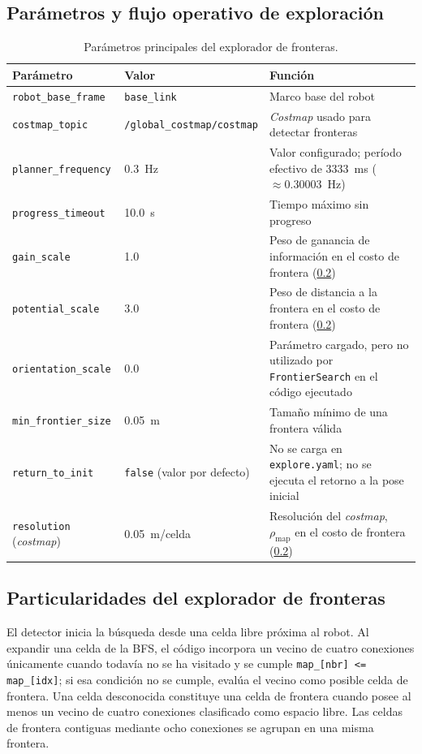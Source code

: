 \begin{appendices}
\subsection{Parámetros y flujo operativo de exploración}

\begin{table}[H]
\centering
\caption{Parámetros principales del explorador de fronteras.}
\label{tab:explore_params_ch9}
\small
\begin{tabular}{p{3.5cm} p{4.5cm} p{5.8cm}}
\toprule
\textbf{Parámetro} & \textbf{Valor} & \textbf{Función} \\
\midrule
\texttt{robot\_base\_frame} & \texttt{base\_link} & Marco base del robot \\
\texttt{costmap\_topic} & \texttt{/global\_costmap/costmap} & \textit{Costmap} usado para detectar fronteras \\
\texttt{planner\_frequency} & 0.3~Hz & Valor configurado; período efectivo de 3333~ms ($\approx0.30003$~Hz) \\
\texttt{progress\_timeout} & 10.0~s & Tiempo máximo sin progreso \\
\texttt{gain\_scale} & 1.0 & Peso de ganancia de información en el costo de frontera (\ref{anx:explore_impl}) \\
\texttt{potential\_scale} & 3.0 & Peso de distancia a la frontera en el costo de frontera (\ref{anx:explore_impl}) \\
\texttt{orientation\_scale} & 0.0 & Parámetro cargado, pero no utilizado por \texttt{FrontierSearch} en el código ejecutado \\
\texttt{min\_frontier\_size} & 0.05~m & Tamaño mínimo de una frontera válida \\
\texttt{return\_to\_init} & \texttt{false} (valor por defecto) & No se carga en \texttt{explore.yaml}; no se ejecuta el retorno a la pose inicial \\
\texttt{resolution} (\textit{costmap}) & 0.05~m/celda & Resolución del \textit{costmap}, $\rho_{\mathrm{map}}$ en el costo de frontera (\ref{anx:explore_impl}) \\
\bottomrule
\end{tabular}
\end{table}

\subsection{Particularidades del explorador de fronteras}
\label{anx:explore_impl}

El detector inicia la búsqueda desde una celda libre próxima al robot. Al expandir una celda de la BFS, el código incorpora un vecino de cuatro conexiones únicamente cuando todavía no se ha visitado y se cumple \texttt{map\_[nbr] <= map\_[idx]}; si esa condición no se cumple, evalúa el vecino como posible celda de frontera. Una celda desconocida constituye una celda de frontera cuando posee al menos un vecino de cuatro conexiones clasificado como espacio libre. Las celdas de frontera contiguas mediante ocho conexiones se agrupan en una misma frontera.


\end{appendices}
